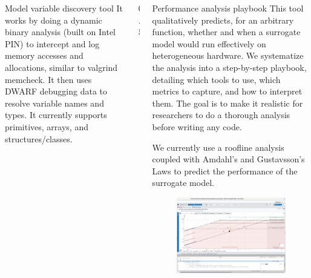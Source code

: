 \documentclass[final]{beamer}
\newlength{\sepwid}
\newlength{\onecolwid}
\begin{document}
\begin{frame}[fragile,t]
\begin{columns}[t]
\begin{column}{\onecolwid}
\begin{block}{Model variable discovery tool}
It works by doing a dynamic binary analysis (built on Intel PIN) to intercept and log memory accesses and allocations, similar to valgrind memcheck. It then uses DWARF debugging data to resolve variable names and types. It currently supports primitives, arrays, and structures/classes. 

\end{block}



\end{column} %

\begin{column}{0.5\sepwid}\end{column} %

\begin{column}{\onecolwid} %


\begin{block}{Performance analysis playbook}
This tool qualitatively predicts, for an arbitrary function, whether and when a surrogate model would run effectively on heterogeneous hardware.
We systematize the analysis into a step-by-step playbook, detailing which tools to use, which metrics to capture, and how to interpret them. The goal is to make it realistic for researchers to do a thorough analysis before writing any code. 

We currently use a roofline analysis coupled with Amdahl's and Gustavsson's Laws to predict the performance of the surrogate model.

\end{block}



\begin{figure}
\includegraphics[width=0.8\linewidth]{roofline.png}
\end{figure}



\end{column}
\end{columns}
\end{frame}
\end{document}
